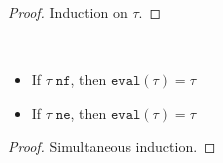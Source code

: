 \idxsubsteval*
\begin{proof}
Induction on $\tau$.
\end{proof}


\normthm*


\begin{theorem}
~\begin{itemize}
  \item If $\tau \; \texttt{nf}$, then $\texttt{eval}(\tau) = \tau$
  \item If $\tau \; \texttt{ne}$, then $\texttt{eval}(\tau) = \tau$
\end{itemize}
\label{thm:norm-idemp}
\end{theorem}
\begin{proof}
Simultaneous induction.
\end{proof}
